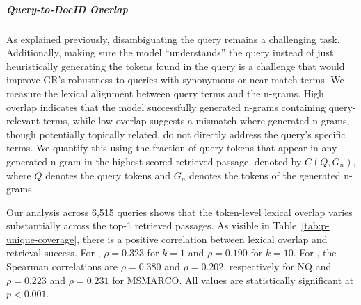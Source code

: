 \subparagraph{Query-to-DocID Overlap}
\label{sec:query-ngram-overlap}

As explained previously, disambiguating the query remains a challenging task. Additionally, making sure the model ``understands'' the query instead of just heuristically generating the tokens found in the query is a challenge that would improve GR's robustness to queries with synonymous or near-match terms. We measure the lexical alignment between query terms and the n-grams. High overlap indicates that the model successfully generated n-grams containing query-relevant terms, while low overlap suggests a mismatch where generated n-grams, though potentially topically related, do not directly address the query's specific terms. We quantify this using the fraction of query tokens that appear in any generated n-gram in the highest-scored retrieved passage, denoted by $C(Q, G_n)$, where $Q$ denotes the query tokens and $G_n$ denotes the tokens of the generated n-grams.

Our analysis across 6,515 queries shows that the token-level lexical overlap varies substantially across the top-1 retrieved passages. As visible in Table~\ref{tab:p-unique-coverage}, there is a positive correlation between lexical overlap and retrieval success. For , $\rho = 0.323$ for  $k=1$ and $\rho = 0.190 $ for  $k=10$. For , the Spearman correlations are $\rho = 0.380$ and $\rho = 0.202$, respectively for NQ and $\rho = 0.223$ and $\rho = 0.231$ for MSMARCO. All values are statistically significant at $p<0.001$. 

\begin{table}[H]
    \centering
    \caption{Hits@$k$ by $C(Q, G_n)$ buckets.}
    \label{tab:p-unique-coverage}
\end{table}

